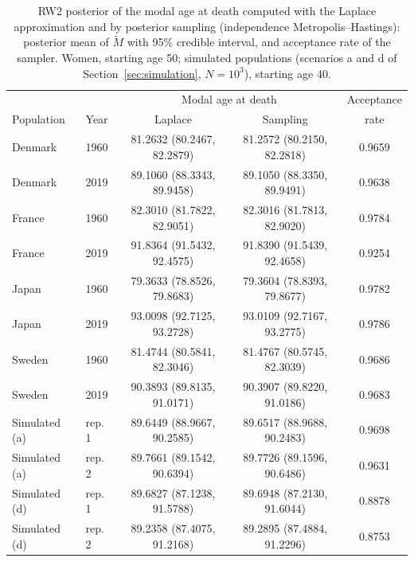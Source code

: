 \begin{table}[htb!]
\centering
\caption{RW2 posterior of the modal age at death computed with the Laplace approximation and by posterior sampling (independence Metropolis--Hastings): posterior mean of $\tilde{M}$ with 95\% credible interval, and acceptance rate of the sampler. Women, starting age 50; simulated populations (scenarios a and d of Section~\ref{sec:simulation}, $N = 10^3$), starting age 40.}
\label{tab:app_mcmc}
\small
\begin{tabular}{llccc}
\hline
 & & \multicolumn{2}{c}{Modal age at death} & Acceptance \\
Population & Year & Laplace & Sampling & rate \\
\hline
Denmark & 1960 & 81.2632 (80.2467, 82.2879) & 81.2572 (80.2150, 82.2818) & 0.9659 \\
Denmark & 2019 & 89.1060 (88.3343, 89.9458) & 89.1050 (88.3350, 89.9491) & 0.9638 \\
France & 1960 & 82.3010 (81.7822, 82.9051) & 82.3016 (81.7813, 82.9020) & 0.9784 \\
France & 2019 & 91.8364 (91.5432, 92.4575) & 91.8390 (91.5439, 92.4658) & 0.9254 \\
Japan & 1960 & 79.3633 (78.8526, 79.8683) & 79.3604 (78.8393, 79.8677) & 0.9782 \\
Japan & 2019 & 93.0098 (92.7125, 93.2728) & 93.0109 (92.7167, 93.2775) & 0.9786 \\
Sweden & 1960 & 81.4744 (80.5841, 82.3046) & 81.4767 (80.5745, 82.3039) & 0.9686 \\
Sweden & 2019 & 90.3893 (89.8135, 91.0171) & 90.3907 (89.8220, 91.0186) & 0.9683 \\
Simulated (a) & rep. 1 & 89.6449 (88.9667, 90.2585) & 89.6517 (88.9688, 90.2483) & 0.9698 \\
Simulated (a) & rep. 2 & 89.7661 (89.1542, 90.6394) & 89.7726 (89.1596, 90.6486) & 0.9631 \\
Simulated (d) & rep. 1 & 89.6827 (87.1238, 91.5788) & 89.6948 (87.2130, 91.6044) & 0.8878 \\
Simulated (d) & rep. 2 & 89.2358 (87.4075, 91.2168) & 89.2895 (87.4884, 91.2296) & 0.8753 \\
\hline
\end{tabular}
\end{table}
